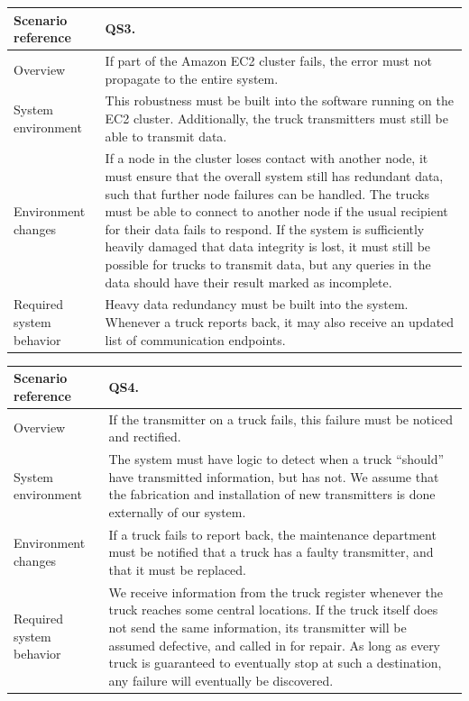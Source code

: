 \documentclass[a4paper,11pt]{report}
\begin{document}
\begin{center}
  \begin{tabular}[h!]{| >{\columncolor{gray}}p{} | p{} |}
    \hline
    Scenario reference & QS3. \\
    \hline
    Overview & If part of the Amazon EC2 cluster fails, the error must not propagate to the entire system.\\
    \hline
    System environment & This robustness must be built into the software running on the EC2 cluster.  Additionally, the truck transmitters must still be able to transmit data. \\
    \hline
    Environment changes & If a node in the cluster loses contact with another node, it must ensure that the overall system still has redundant data, such that further node failures can be handled.  The trucks must be able to connect to another node if the usual recipient for their data fails to respond.  If the system is sufficiently heavily damaged that data integrity is lost, it must still be possible for trucks to transmit data, but any queries in the data should have their result marked as incomplete.  \\
    \hline
    Required system behavior & Heavy data redundancy must be built into the system.  Whenever a truck reports back, it may also receive an updated list of communication endpoints. \\
    \hline
  \end{tabular}
\end{center}

\begin{center}
  \begin{tabular}[h!]{| >{\columncolor{gray}}p{} | p{} |}
    \hline
    Scenario reference & QS4. \\
    \hline
    Overview & If the transmitter on a truck fails, this failure must be noticed and rectified. \\
    \hline
    System environment & The system must have logic to detect when a truck ``should'' have transmitted information, but has not.  We assume that the fabrication and installation of new transmitters is done externally of our system. \\
    \hline
    Environment changes & If a truck fails to report back, the maintenance department must be notified that a truck has a faulty transmitter, and that it must be replaced. \\
    \hline
    Required system behavior & We receive information from the truck register whenever the truck reaches some central locations.  If the truck itself does not send the same information, its transmitter will be assumed defective, and called in for repair.  As long as every truck is guaranteed to eventually stop at such a destination, any failure will eventually be discovered. \\
    \hline
  \end{tabular}
\end{center}
\end{document}
